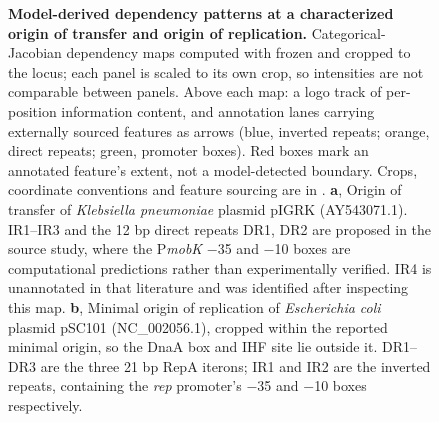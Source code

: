 %
%
\begin{figure}[h]
    \centering
\caption{
\textbf{Model-derived dependency patterns at a characterized origin of transfer and origin of replication.} Categorical-Jacobian dependency maps computed with frozen \model and cropped to the locus; each panel is scaled to its own crop, so intensities are not comparable between panels. Above each map: a logo track of per-position information content, and annotation lanes carrying externally sourced features as arrows (blue, inverted repeats; orange, direct repeats; green, promoter boxes). Red boxes mark an annotated feature's extent, not a model-detected boundary. Crops, coordinate conventions and feature sourcing are in . \textbf{a}, Origin of transfer of \emph{Klebsiella pneumoniae} plasmid pIGRK (AY543071.1). IR1--IR3 and the 12 bp direct repeats DR1, DR2 are proposed in the source study, where the P\emph{mobK} $-$35 and $-$10 boxes are computational predictions rather than experimentally verified. IR4 is unannotated in that literature and was identified after inspecting this map. \textbf{b}, Minimal origin of replication of \emph{Escherichia coli} plasmid pSC101 (NC\_002056.1), cropped within the reported minimal origin, so the DnaA box and IHF site lie outside it. DR1--DR3 are the three 21 bp RepA iterons; IR1 and IR2 are the inverted repeats, containing the \emph{rep} promoter's $-$35 and $-$10 boxes respectively.
}
\label{fig:interpretation}
\end{figure}


